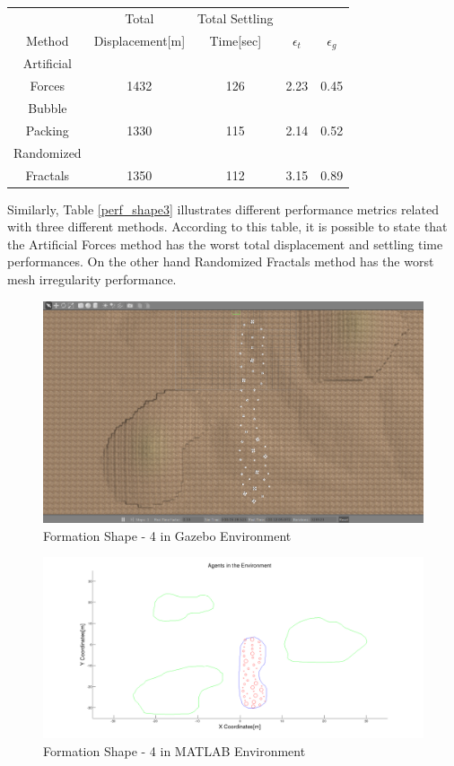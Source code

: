 \begin{center}
 \label{perf_shape3} 
\begin{tabular}{|c|c|c|c|c|}
					
\hline
& Total  & Total Settling &  &\\ Method & Displacement[m] & Time[sec]& \textbf{$\epsilon_t$} & \textbf{$\epsilon_g$} \\
\hline
Artificial&  &  &  & \\
 Forces & 1432 & 126& 2.23 & 0.45\\
 \hline
 Bubble&  &  &  & \\
 Packing &1330 &115 &2.14 & 0.52\\
\hline
 Randomized&  &  &  & \\
 Fractals &1350 &112 &3.15 & 0.89\\
\hline
\end{tabular}
\end{center}

Similarly, Table \ref{perf_shape3} illustrates different performance metrics related with three different methods. According to this table, it is possible to state that the Artificial Forces method has the worst total displacement and settling time performances. On the other hand Randomized Fractals method has the worst mesh irregularity performance.				 
\begin{figure}[H]
\caption{Formation Shape - 4 in Gazebo Environment}
\centerline{\includegraphics[scale = 0.32]{4_Gazebo}}
\end{figure} 
			
\begin{figure}[H]
\caption{Formation Shape - 4 in MATLAB Environment}
\centerline{\includegraphics[scale = 0.32]{4}}
\end{figure} 
			
